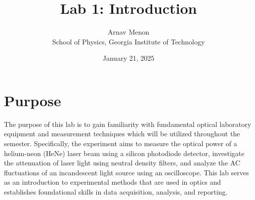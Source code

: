 \documentclass[12pt]{article}
\title{Lab 1: Introduction}
\author{Arnav Menon \\ School of Physics, Georgia Institute of Technology}
\date{January 21, 2025}
\begin{document}
\maketitle

\section*{Purpose}
The purpose of this lab is to gain familiarity with fundamental optical laboratory equipment and measurement techniques which will be utilized throughout the semester. Specifically, the experiment aims to measure the optical power of a helium-neon (HeNe) laser beam using a silicon photodiode detector, investigate the attenuation of laser light using neutral density filters, and analyze the AC fluctuations of an incandescent light source using an oscilloscope. This lab serves as an introduction to experimental methods that are used in optics and establishes foundational skills in data acquisition, analysis, and reporting.
\end{document}
